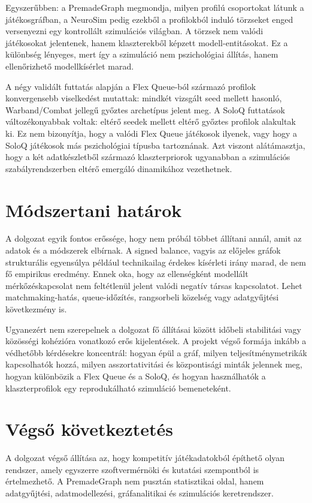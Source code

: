 ﻿\documentclass[a4paper,12pt]{report}
\begin{document}
Egyszerűbben: a PremadeGraph megmondja, milyen profilú csoportokat látunk a játékosgráfban,
a NeuroSim pedig ezekből a profilokból induló törzseket enged versenyezni egy kontrollált
szimulációs világban. A törzsek nem valódi játékosokat jelentenek, hanem klaszterekből képzett
modell-entitásokat. Ez a különbség lényeges, mert így a szimuláció nem pszichológiai állítás,
hanem ellenőrizhető modellkísérlet marad.

A négy validált futtatás alapján a Flex Queue-ból származó profilok konvergensebb viselkedést
mutattak: mindkét vizsgált seed mellett hasonló, Warband/Combat jellegű győztes archetípus jelent
meg. A SoloQ futtatások változékonyabbak voltak: eltérő seedek mellett eltérő győztes profilok
alakultak ki. Ez nem bizonyítja, hogy a valódi Flex Queue játékosok ilyenek, vagy hogy a SoloQ
játékosok más pszichológiai típusba tartoznának. Azt viszont alátámasztja, hogy a két adatkészletből
származó klaszterpriorok ugyanabban a szimulációs szabályrendszerben eltérő emergáló dinamikához
vezethetnek.

\section{Módszertani határok}

A dolgozat egyik fontos erőssége, hogy nem próbál többet állítani annál, amit az adatok és a
módszerek elbírnak. A signed balance, vagyis az előjeles gráfok strukturális egyensúlya például
technikailag érdekes kísérleti irány marad, de nem fő empirikus eredmény. Ennek oka, hogy az
ellenségként modellált mérkőzéskapcsolat nem feltétlenül jelent valódi negatív társas kapcsolatot.
Lehet matchmaking-hatás, queue-időzítés, rangsorbeli közelség vagy adatgyűjtési következmény is.

Ugyanezért nem szerepelnek a dolgozat fő állításai között időbeli stabilitási vagy közösségi
kohézióra vonatkozó erős kijelentések. A projekt végső formája inkább a védhetőbb kérdésekre
koncentrál: hogyan épül a gráf, milyen teljesítménymetrikák kapcsolhatók hozzá, milyen
asszortativitási és központisági minták jelennek meg, hogyan különbözik a Flex Queue és a SoloQ,
és hogyan használhatók a klaszterprofilok egy reprodukálható szimuláció bemeneteként.

\section{Végső következtetés}

A dolgozat végső állítása az, hogy kompetitív játékadatokból építhető olyan rendszer, amely egyszerre
szoftvermérnöki és kutatási szempontból is értelmezhető. A PremadeGraph nem pusztán statisztikai
oldal, hanem adatgyűjtési, adatmodellezési, gráfanalitikai és szimulációs keretrendszer.
\end{document}
